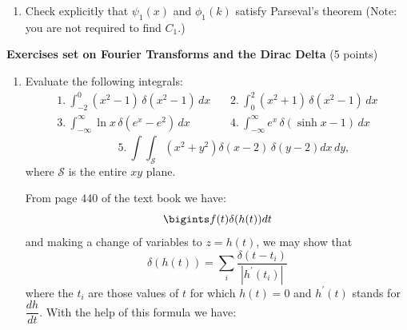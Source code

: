 \documentclass[fleqn]{article}
\begin{document}
\begin{enumerate}
\begin{enumerate}
        \item Check explicitly that $\psi _{1}\left( x\right)$ and $\phi _{1}\left(k\right)$ satisfy Parseval's theorem (Note: you are not required to find $C_1$.)
    
      \end{enumerate}
    
    
  \end{enumerate}

  \pagebreak

  \textbf{Exercises set on Fourier Transforms and the Dirac Delta} (5 points)
  \begin{enumerate}

    \item Evaluate the following integrals: 
    \[
    \begin{array}{lll}
    1.\ \int_{-2}^{0}\left( x^{2}-1\right) \,\delta \left( x^{2}-1\right)
    \,dx & \, & 2.\ \int_{0}^{2}\left( x^{2}+1\right) \,\delta \left(
    x^{2}-1\right) \,dx \\ 
    3.\ \int_{-\infty }^{\infty }\ln x\,\delta \left( e^{x}-e^{2}\right)
    \,dx & \, & 4.\ \int_{-\infty }^{\infty }e^{x}\,\delta \left( \sinh
    x-1\right) \,dx
    \end{array}
    \]
    \[
    \hspace{3em} 5.\ \int \! \int_{\mathcal{S}}\left( x^{2}+y^{2}\right)
    \delta \left( x-2\right) \,\delta \left( y-2\right) dx\,dy,
    \]
    where $\mathcal{S}$ is the entire $xy$ plane.

      \textcolor{hwColor}{
        From page 440 of the text book we have:
        $$\bigints f(t) \delta(h(t)) dt$$
        and making a change of variables to $z=h(t)$, we may show that 
        $$\delta(h(t))=\sum\limits_{i} \dfrac{\delta(t-t_i)}{|h^{'}(t_i)|}$$
        where the $t_i$ are those values of $t$ for which $h(t)=0$ and $h^{'}(t)$ stands for $\dfrac{dh}{dt}$.
        With the help of this formula we have: \\ \\
      }
    

\end{enumerate}
\end{document}
